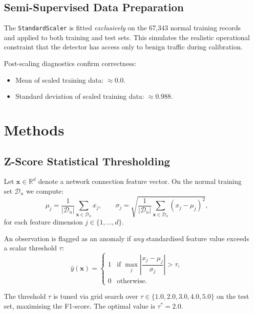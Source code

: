 \documentclass[conference]{IEEEtran}
\begin{document}
\subsection{Semi-Supervised Data Preparation}
The \texttt{StandardScaler} is fitted \emph{exclusively} on the 67,343 normal
training records and applied to both training and test sets.  This simulates the
realistic operational constraint that the detector has access only to benign
traffic during calibration.

Post-scaling diagnostics confirm correctness:
\begin{itemize}
  \item Mean of scaled training data: $\approx 0.0$.
  \item Standard deviation of scaled training data: $\approx 0.988$.
\end{itemize}

\section{Methods}
\label{sec:methods}

\subsection{Z-Score Statistical Thresholding}
\label{ssec:zscore}

Let $\mathbf{x} \in \mathbb{R}^{d}$ denote a network connection feature vector.
On the normal training set $\mathcal{D}_n$ we compute:
\[
  \mu_j = \frac{1}{|\mathcal{D}_n|} \sum_{\mathbf{x} \in \mathcal{D}_n} x_j,
  \qquad
  \sigma_j = \sqrt{\frac{1}{|\mathcal{D}_n|} \sum_{\mathbf{x} \in \mathcal{D}_n}
             (x_j - \mu_j)^2},
\]
for each feature dimension $j \in \{1,\ldots,d\}$.

An observation is flagged as an anomaly if \emph{any} standardised feature value
exceeds a scalar threshold $\tau$:
\begin{equation}
  \hat{y}(\mathbf{x}) =
  \begin{cases}
    1 & \text{if } \max_j \left|\dfrac{x_j - \mu_j}{\sigma_j}\right| > \tau,\\[6pt]
    0 & \text{otherwise.}
  \end{cases}
\end{equation}

The threshold $\tau$ is tuned via grid search over $\tau \in \{1.0, 2.0, 3.0, 4.0, 5.0\}$
on the test set, maximising the F1-score.  The optimal value is $\tau^{*} = 2.0$.
\end{document}
